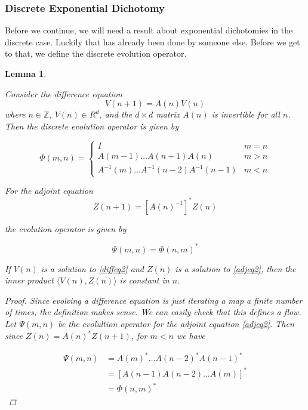 \documentclass[12pt]{article}
\def\Z{{\mathbb Z}}
\newtheorem{lemma}{Lemma}
\begin{document}
\subsubsection{Discrete Exponential Dichotomy}

Before we continue, we will need a result about exponential dichotomies in the discrete case. Luckily that has already been done by someone else. Before we get to that, we define the discrete evolution operator.

\begin{lemma}\label{evolop}

Consider the difference equation
\begin{equation}\label{diffeq2}
V(n+1) = A(n) V(n)
\end{equation}
where $n \in \Z$, $V(n) \in R^d$, and the $d \times d$ matrix $A(n)$ is invertible for all $n$. Then the discrete evolution operator is given by

\begin{equation}\label{evol}
\Phi(m, n) = 
\begin{cases}
I & m = n \\
A(m-1) \dots A(n+1) A(n) & m > n \\
A^{-1}(m) \dots A^{-1}(n-2) A^{-1}(n-1) & m < n
\end{cases}
\end{equation}

For the adjoint equation
\begin{equation}\label{adjeq2}
Z(n+1) = [A(n)^{-1}]^* Z(n)
\end{equation}

the evolution operator is given by

\begin{equation}\label{adjevol}
\Psi(m, n) = \Phi(n, m)^*
\end{equation}

If $V(n)$ is a solution to \eqref{diffeq2} and $Z(n)$ is a solution to \eqref{adjeq2}, then the inner product $\langle V(n), Z(n) \rangle$ is constant in $n$.

\begin{proof}
Since evolving a difference equation is just iterating a map a finite number of times, the definition makes sense. We can easily check that this defines a flow. Let $\Psi(m, n)$ be the evolultion operator for the adjoint equation \eqref{adjeq2}. Then since $Z(n) = A(n)^* Z(n+1)$, for $m < n$ we have

\begin{align*}
\Psi(m, n) &= A(m)^* \dots A(n-2)^* A(n-1)^* \\
&= [A(n-1) A(n-2) \dots A(m)]^* \\
&= \Phi(n, m)^*
\end{align*}


\end{proof}
\end{lemma}
\end{document}
